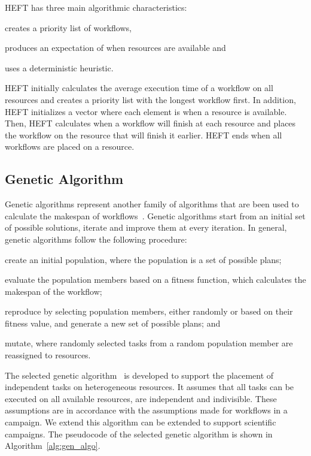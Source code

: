 HEFT has three main algorithmic characteristics:
\begin{inparaenum}[1)]
    \item creates a priority list of workflows,
    \item produces an expectation of when resources are available and
    \item uses a deterministic heuristic.
\end{inparaenum}
HEFT initially calculates the average execution time of a workflow on all resources and creates a priority list with the longest workflow first.
In addition, HEFT initializes a vector where each element is when a resource is available.
Then, HEFT calculates when a workflow will finish at each resource and places the workflow on the resource that will finish it earlier.
HEFT ends when all workflows are placed on a resource.

   
\subsection{Genetic Algorithm}
\label{algo:gen}
Genetic algorithms represent another family of algorithms that are been used to calculate the makespan of workflows~\cite{dong2006scheduling}.
Genetic algorithms start from an initial set of possible solutions, iterate and improve them at every iteration.
In general, genetic algorithms follow the following procedure:
\begin{inparaenum}[(i)]
    \item create an initial population, where the population is a set of possible plans;
    \item evaluate the population members based on a fitness function, which calculates the makespan of the workflow;
    \item reproduce by selecting population members, either randomly or based on their fitness value, and generate a new set of possible plans; and
    \item mutate, where randomly selected tasks from a random population member are reassigned to resources.%
\end{inparaenum}

The selected genetic algorithm~\cite{page2005algorithm} is developed to support the placement of independent tasks on heterogeneous resources.
It assumes that all tasks can be executed on all available resources, are independent and indivisible.
These assumptions are in accordance with the assumptions made for workflows in a campaign.
We extend this algorithm can be extended to support scientific campaigns.
The pseudocode of the selected genetic algorithm is shown in Algorithm~\ref{alg:gen_algo}.

